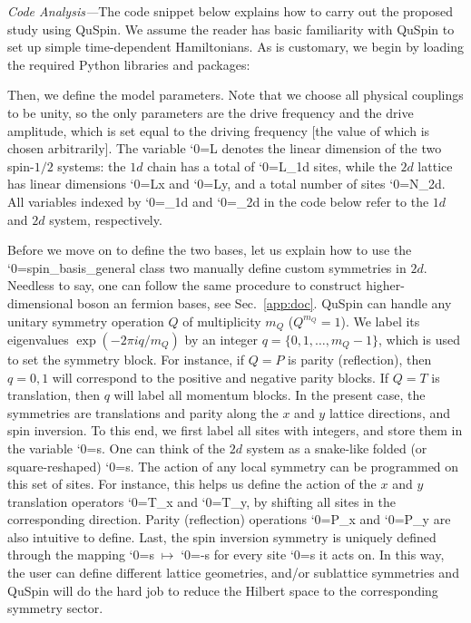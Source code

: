 \documentclass{SciPost}
\newcommand\0{\scalebox{-1}[1]{0}}
\let\svttfamily\ttfamily
\renewcommand\ttfamily{\svttfamily\catcode`0=\active }
\renewcommand\texttt{\bgroup\ttfamily\texttthelp}
\def\texttthelp#1{#1\egroup}
\newcommand{\Spincode}{example9.py}
\begin{document}
\noindent\emph{Code Analysis---}The code snippet below explains how to carry out the proposed study using QuSpin. We assume the reader has basic familiarity with QuSpin to set up simple time-dependent Hamiltonians. As is customary, we begin by loading the required Python libraries and packages:

Then, we define the model parameters. Note that we choose all physical couplings to be unity, so the only parameters are the drive frequency and the drive amplitude, which is set equal to the driving frequency [the value of which is chosen arbitrarily]. The variable \texttt{L} denotes the linear dimension of the two spin-$1/2$ systems: the $1d$ chain has a total of \texttt{L\_1d} sites, while the $2d$ lattice has linear dimensions \texttt{Lx} and \texttt{Ly}, and a total number of sites \texttt{N\_2d}. All variables indexed by \texttt{\_1d} and \texttt{\_2d} in the code below refer to the $1d$ and $2d$ system, respectively. 

Before we move on to define the two bases, let us explain how to use the \texttt{spin\_basis\_general} class two manually define custom symmetries in $2d$. Needless to say, one can follow the same procedure to construct higher-dimensional boson an fermion bases, see Sec.~\ref{app:doc}. QuSpin can handle any unitary symmetry operation $Q$ of multiplicity $m_Q$ ($Q^{m_Q}=1$). We label its eigenvalues $\exp(-2\pi i q/m_Q)$ by an integer $q=\{0,1,\dots,m_Q-1\}$, which is used to set the symmetry block. For instance, if $Q=P$ is parity (reflection), then $q=0,1$ will correspond to the positive and negative parity blocks. If $Q=T$ is translation, then $q$ will label all momentum blocks. In the present case, the symmetries are translations and parity along the $x$ and $y$ lattice directions, and spin inversion. To this end, we first label all sites with integers, and store them in the variable \texttt{s}. One can think of the $2d$ system as a snake-like folded (or square-reshaped) \texttt{s}. The action of any local symmetry can be programmed on this set of sites. For instance, this helps us define the action of the $x$ and $y$ translation operators \texttt{T\_x} and \texttt{T\_y}, by shifting all sites in the corresponding direction. Parity (reflection) operations \texttt{P\_x} and \texttt{P\_y} are also intuitive to define. Last, the spin inversion symmetry is uniquely defined through the mapping \texttt{s}$\;\mapsto\;$\texttt{1-s} for every site \texttt{s} it acts on. In this way, the user can define different lattice geometries, and/or sublattice symmetries and QuSpin will do the hard job to reduce the Hilbert space to the corresponding symmetry sector.
\end{document}

